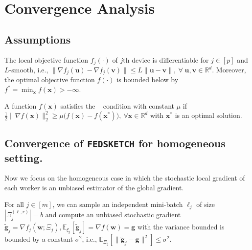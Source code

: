 \section{Convergence Analysis}\label{sec:cnvg-an}

\subsection{Assumptions}


\begin{assumption}\label{Assu:1}
The local objective function $f_j(\cdot)$ of $j$th device is differentiable for $j\in [p]$ and $L$-smooth, i.e., $\|\nabla f_j(\boldsymbol{u})-\nabla f_j(\mathbf{v})\|\leq L\|\boldsymbol{u}-\mathbf{v}\|,\: \forall \;\boldsymbol{u},\mathbf{v}\in\mathbb{R}^d$. Moreover, the optimal objective function $f(\cdot)$ is bounded below by ${f^*} = \min_{\boldsymbol{x}} f(\boldsymbol{x})>-\infty$. 
\end{assumption}

\begin{assumption}[\pl]\label{assum:pl}
A function $f(\boldsymbol{x})$ satisfies the \pl~ condition with constant $\mu$ if $\frac{1}{2}\|\nabla f(\boldsymbol{x})\|_2^2\geq \mu\big(f(\boldsymbol{x})-f(\boldsymbol{x}^*)\big),\: \forall \boldsymbol{x}\in\mathbb{R}^d $ with $\boldsymbol{x}^*$ is an optimal solution.
\end{assumption}


\subsection{Convergence of  \texttt{FEDSKETCH} for homogeneous setting.} 
Now we focus on the homogeneous case in which the stochastic local gradient of each worker is an unbiased estimator of the global gradient.


\begin{assumption}\label{Assu:1.5}
For all $j\in [m]$, we can sample an independent mini-batch $\ell_j$   of size $|\Xi_j^{(\ell,r)}| = b$ and compute an unbiased stochastic gradient  $\tilde{\mathbf{g}}_j = \nabla f_j(\boldsymbol{w}; \Xi_j), \mathbb{E}_{\xi_j}[\tilde{\mathbf{g}}_j] = \nabla f(\boldsymbol{w})=\mathbf{g}$ with  the variance bounded is bounded by a constant $\sigma^2$, i.e., $
\mathbb{E}_{\Xi_j}\left[\|\tilde{\mathbf{g}}_j-\mathbf{g}\|^2\right]\leq \sigma^2$.
\end{assumption}


